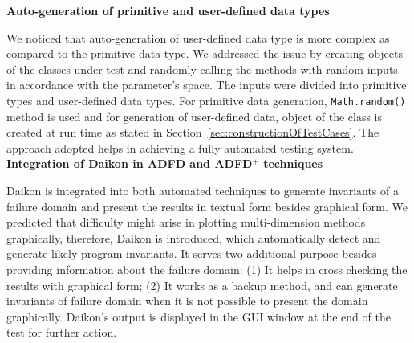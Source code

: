 \textbf{Auto-generation of primitive and user-defined data types}

We noticed that auto-generation of user-defined data type is more complex as compared to the primitive data type. We addressed the issue by creating objects of the classes under test and randomly calling the methods with random inputs in accordance with the parameter's space. The inputs were divided into primitive types and user-defined data types.  For primitive data generation, \verb+Math.random()+ method is used and for generation of user-defined data, object of the class is created at run time as stated in Section~\ref{sec:constructionOfTestCases}. The approach adopted helps in achieving a fully automated testing system.\\








\textbf{Integration of Daikon in ADFD and ADFD$^+$ techniques}

Daikon is integrated into both automated techniques to generate invariants of a failure domain and present the results in textual form besides graphical form. We predicted that difficulty might arise in plotting multi-dimension methods graphically, therefore, Daikon is introduced, which automatically detect and generate likely program invariants. It serves two additional purpose besides providing information about the failure domain: (1) It helps in cross checking the results with graphical form; (2) It works as a backup method, and can generate invariants of failure domain when it is not possible to present the domain graphically. Daikon's output is displayed in the GUI window at the end of the test for further action.\\
\clearpage



